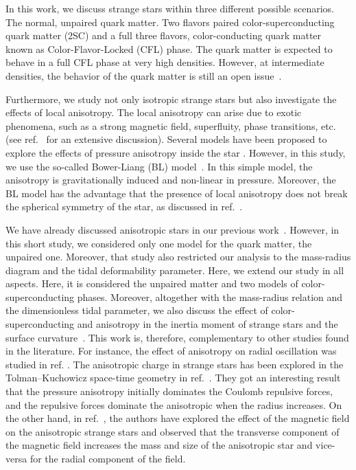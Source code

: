 \documentclass[%
reprint,
superscriptaddress,
nofootinbib,
amsmath,
amssymb,
aps,
floatfix,
showkeys,
]{revtex4-2}
\begin{document}
In this work, we discuss strange stars within three different possible scenarios. The normal, unpaired quark matter. Two flavors paired color-superconducting quark matter (2SC) and a full three flavors, color-conducting quark matter known as Color-Flavor-Locked (CFL) phase.  The quark matter is expected to behave in a full CFL phase at very high densities. However, at intermediate densities, the behavior of the quark matter is still an open issue~\cite{Alford2002, Alford2008}.





Furthermore, we study not only isotropic strange stars but also investigate the effects of local anisotropy. {The local anisotropy can arise due to exotic phenomena, such as a strong magnetic field, superfluity, phase transitions, etc. (see ref.~\cite{Herrera_1997} for an extensive discussion). Several models have been proposed to explore the effects of pressure anisotropy inside the star \cite{Das_ILC_2022}. However, in this study, we use the so-called Bower-Liang (BL) model~\cite{Bowers_1974}}. In this simple model, the anisotropy is gravitationally induced and non-linear in pressure.  Moreover, the BL model has the advantage that the presence of local anisotropy does not break the spherical symmetry of the star, as discussed in ref.~\cite{DelgadoeDelgado2018}.

We have already discussed anisotropic stars in our previous work~\cite{Lopes2023M}. However, in this short study, we considered only one model for the quark matter, the unpaired one. Moreover, that study also restricted our analysis to the mass-radius diagram and the tidal deformability parameter. Here, we extend our study in all aspects.  Here, it is considered the unpaired matter and two models of color-superconducting phases. Moreover, altogether with the mass-radius relation and the dimensionless tidal parameter, we also discuss the effect of color-superconducting and anisotropy in the inertia moment of strange stars and the surface curvature~\cite{Kazim_2014}. This work is, therefore, complementary to other studies found in the literature.  For instance, the effect of anisotropy on radial oscillation was studied in ref. \cite{Arbanil_2016}. The anisotropic charge in strange stars has been explored in the Tolman–Kuchowicz space-time geometry in  ref.~\cite{Maurya_2019}. They got an interesting result that the pressure anisotropy initially dominates the Coulomb repulsive forces, and the repulsive forces dominate the anisotropic when the radius increases. On the other hand, in ref.~\cite{Deb_2021}, the authors have explored the effect of the magnetic field on the anisotropic strange stars and observed that the transverse component of the magnetic field increases the mass and size of the anisotropic star and vice-versa for the radial component of the field.
\end{document}
